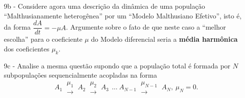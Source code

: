     9b - Considere agora uma descrição da dinâmica de uma população ``Malthusianamente heterogênea'' por um ``Modelo Malthusiano Efetivo'', isto é, da forma \(\dfrac{dA}{dt} = -\mu A\). Argumente sobre o fato de que neste caso a ``melhor escolha'' para o coeficiente \(\mu\) do Modelo diferencial seria a \textbf{média harmônica} dos coeficientes \(\mu_k\).

    9c - Analise a mesma questão supondo que a população total é formada por \(N\) subpopulações sequencialmente acopladas na forma
    \[
    A_1 \ \substack{\mu_1 \\ \longrightarrow} \
    A_2 \ \substack{\mu_2 \\ \longrightarrow} \
    A_3 \
    \ \ldots \
    A_{N-1} \ \substack{\mu_{N-1} \\ \longrightarrow} \
    A_{N},\ \mu_N = 0.\]



